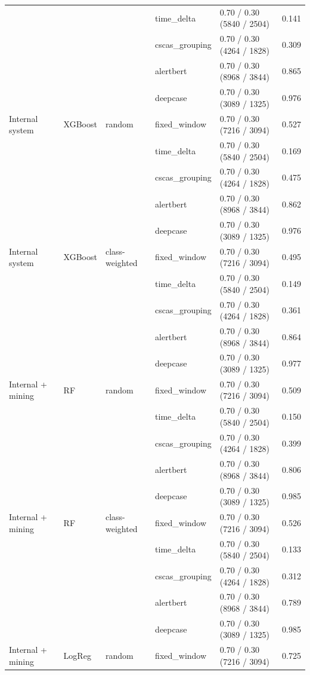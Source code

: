 \begin{table}[htbp]
{\begin{tabular}{lllllc}
 &  &  & time\_delta & 0.70 / 0.30 (5840 / 2504) & 0.141 \\
 &  &  & cscas\_grouping & 0.70 / 0.30 (4264 / 1828) & 0.309 \\
 &  &  & alertbert & 0.70 / 0.30 (8968 / 3844) & 0.865 \\
 &  &  & deepcase & 0.70 / 0.30 (3089 / 1325) & 0.976 \\
\addlinespace
Internal system & XGBoost & random & fixed\_window & 0.70 / 0.30 (7216 / 3094) & 0.527 \\
 &  &  & time\_delta & 0.70 / 0.30 (5840 / 2504) & 0.169 \\
 &  &  & cscas\_grouping & 0.70 / 0.30 (4264 / 1828) & 0.475 \\
 &  &  & alertbert & 0.70 / 0.30 (8968 / 3844) & 0.862 \\
 &  &  & deepcase & 0.70 / 0.30 (3089 / 1325) & 0.976 \\
\addlinespace
Internal system & XGBoost & class-weighted & fixed\_window & 0.70 / 0.30 (7216 / 3094) & 0.495 \\
 &  &  & time\_delta & 0.70 / 0.30 (5840 / 2504) & 0.149 \\
 &  &  & cscas\_grouping & 0.70 / 0.30 (4264 / 1828) & 0.361 \\
 &  &  & alertbert & 0.70 / 0.30 (8968 / 3844) & 0.864 \\
 &  &  & deepcase & 0.70 / 0.30 (3089 / 1325) & 0.977 \\
\midrule
Internal + mining & RF & random & fixed\_window & 0.70 / 0.30 (7216 / 3094) & 0.509 \\
 &  &  & time\_delta & 0.70 / 0.30 (5840 / 2504) & 0.150 \\
 &  &  & cscas\_grouping & 0.70 / 0.30 (4264 / 1828) & 0.399 \\
 &  &  & alertbert & 0.70 / 0.30 (8968 / 3844) & 0.806 \\
 &  &  & deepcase & 0.70 / 0.30 (3089 / 1325) & 0.985 \\
\addlinespace
Internal + mining & RF & class-weighted & fixed\_window & 0.70 / 0.30 (7216 / 3094) & 0.526 \\
 &  &  & time\_delta & 0.70 / 0.30 (5840 / 2504) & 0.133 \\
 &  &  & cscas\_grouping & 0.70 / 0.30 (4264 / 1828) & 0.312 \\
 &  &  & alertbert & 0.70 / 0.30 (8968 / 3844) & 0.789 \\
 &  &  & deepcase & 0.70 / 0.30 (3089 / 1325) & 0.985 \\
\addlinespace
Internal + mining & LogReg & random & fixed\_window & 0.70 / 0.30 (7216 / 3094) & 0.725 \\

\end{tabular}}
\end{table}
